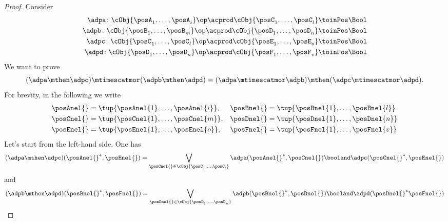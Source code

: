 \begin{proof}
    Consider
    \begin{equation*}
        \begin{aligned}
            \adpa\colon \cObj{\posA_1,\ldots, \posA_i}\op \acprod \cObj{\posC_1,\ldots, \posC_l} & \toinPos \Bool \\
            \adpb\colon \cObj{\posB_1,\ldots, \posB_m}\op \acprod \cObj{\posD_1,\ldots, \posD_n} & \toinPos \Bool \\
            \adpc\colon \cObj{\posC_1,\ldots, \posC_l}\op \acprod \cObj{\posE_1,\ldots, \posE_o} & \toinPos \Bool \\
            \adpd\colon \cObj{\posD_1,\ldots, \posD_n}\op \acprod \cObj{\posF_1,\ldots, \posF_v} & \toinPos \Bool
        \end{aligned}
    \end{equation*}
    We want to prove
    \begin{equation*}
        (\adpa \mthen \adpc) \mtimescatmor (\adpb \mthen \adpd)=(\adpa \mtimescatmor \adpb) \mthen (\adpc \mtimescatmor \adpd).
    \end{equation*}
    For brevity, in the following we write
    \begin{align*}
        \posAnel{} & =\tup{\posAnel{1},\ldots, \posAnel{i}}, &
        \posBnel{} & =\tup{\posBnel{1},\ldots, \posBnel{l}} \\
        \posCnel{} & =\tup{\posCnel{1},\ldots, \posCnel{m}}, &
        \posDnel{} & =\tup{\posDnel{1},\ldots, \posDnel{n}} \\
        \posEnel{} & =\tup{\posEnel{1},\ldots, \posEnel{o}}, &
        \posFnel{} & =\tup{\posFnel{1},\ldots, \posFnel{v}}
    \end{align*}
    Let's start from the left-hand side.
    One has
    \begin{equation*}
        (\adpa \mthen \adpc)(\posAnel{}^*,\posEnel{})=\bigvee_{\posCnel{}\in \cObj{\posC_1,\ldots, \posC_l}}
        \adpa(\posAnel{}^*, \posCnel{}) \booland \adpc(\posCnel{}^*,\posEnel{})
    \end{equation*}
    and
    \begin{equation*}
        \begin{aligned}
            (\adpb \mthen \adpd)(\posBnel{}^*,\posFnel{})=\bigvee_{\posDnel{}\in \cObj{\posD_1,\ldots, \posD_n}}
            \adpb(\posBnel{}^*, \posDnel{}) \booland \adpd(\posDnel{}^*\posFnel{})
        \end{aligned}
    \end{equation*}

\end{proof}
